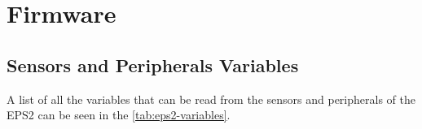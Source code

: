 %
%
%
%
%

%
%
%
%
%
%

\chapter{Firmware} \label{ch:firmware}

\section{Sensors and Peripherals Variables}

A list of all the variables that can be read from the sensors and peripherals of the EPS2 can be seen in the \autoref{tab:eps2-variables}.

